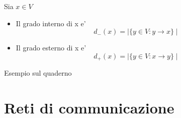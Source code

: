 \documentclass{article}
\begin{document}
        \begin{flushleft}
          Sia $x\in V$
        \end{flushleft}
        \begin{itemize}
          \item Il grado interno di x e'
            \begin{equation*}
              d_-(x)=\mid \{ y\in V:y \to x\} \mid
            \end{equation*}
          \item Il grado esterno di x e'
            \begin{equation*}
              d_+(x)=\mid \{y\in V:x\to y\} \mid
            \end{equation*}
        \end{itemize}
        \begin{flushleft}
          Esempio sul quaderno
        \end{flushleft}
        \section{Reti di communicazione}
\end{document}
